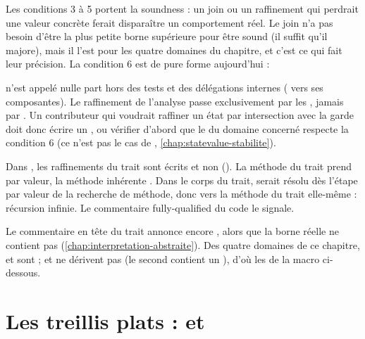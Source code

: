 Les conditions 3 à 5 portent la soundness : un join ou un raffinement qui
perdrait une valeur concrète ferait disparaître un comportement réel. Le join
n'a pas besoin d'être la plus petite borne supérieure pour être sound (il suffit
qu'il majore), mais il l'est pour les quatre domaines du chapitre, et c'est ce
qui fait leur précision. La condition 6 est de pure forme aujourd'hui :

\begin{piege}
   n'est appelé nulle part hors des tests et des délégations
  internes ( vers ses composantes). Le raffinement de
  l'analyse passe exclusivement par les , jamais par
  . Un contributeur qui voudrait raffiner un état par
  \og intersection avec la garde\fg{} doit donc écrire un , ou
  vérifier d'abord que le  du domaine concerné respecte la
  condition 6 (ce n'est pas le cas de ,
  \cref{chap:statevalue-stabilite}).
\end{piege}

\begin{piege}
  Dans , les raffinements du trait sont
  écrits  et non 
  (). La méthode du trait prend
   par valeur, la méthode inhérente . Dans le corps du
  trait,  serait résolu dès l'étape \og par valeur\fg{}
  de la recherche de méthode, donc vers la méthode du trait elle-même :
  récursion infinie. Le commentaire \og fully-qualified\fg{} du code le
  signale.
\end{piege}

\begin{remarque}
  Le commentaire en tête du trait annonce encore , alors
  que la borne réelle ne contient pas 
  (\cref{chap:interpretation-abstraite}). Des quatre domaines de ce chapitre,
   et  sont  ;  et
   ne dérivent pas  (le second contient un
  ), d'où les  de la macro ci-dessous.
\end{remarque}

\section{Les treillis plats :  et }
\label{sec:treillis-simples-plats}

